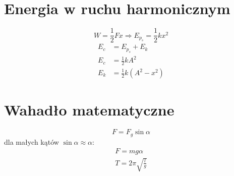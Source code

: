   \section{Energia w ruchu harmonicznym}
    \begin{equation}
      W = \frac{1}{2}Fx \Rightarrow E_{p_s} = \frac{1}{2}kx^2
    \end{equation}
    \begin{align}
      E_c &= E_{p_s} + E_k\\
      E_c &= \frac{1}{2}kA^2\\
      E_k &= \frac{1}{2}k(A^2 - x^2)
    \end{align}
  \section{Wahadło matematyczne}
    \begin{equation}
      F = F_g\sin\alpha
    \end{equation}
    dla małych kątów $\sin\alpha\approx\alpha$:
    \begin{gather}
      F = mg\alpha\\
      T = 2\pi\sqrt{\frac lg}
    \end{gather}
